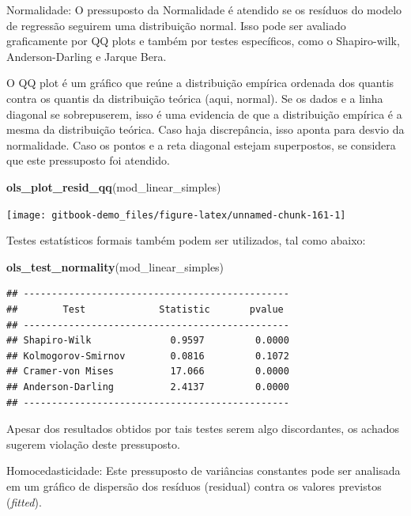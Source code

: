 \documentclass[
]{book}
\newenvironment{Shaded}{\begin{snugshade}}{\end{snugshade}}
\newcommand{\KeywordTok}[1]{\textcolor[rgb]{0.13,0.29,0.53}{\textbf{#1}}}
\newcommand{\NormalTok}[1]{#1}
\begin{document}
Normalidade: O pressuposto da Normalidade é atendido se os resíduos do modelo de regressão seguirem uma distribuição normal. Isso pode ser avaliado graficamente por QQ plots e também por testes específicos, como o Shapiro-wilk, Anderson-Darling e Jarque Bera.

O QQ plot é um gráfico que reúne a distribuição empírica ordenada dos quantis contra os quantis da distribuição teórica (aqui, normal). Se os dados e a linha diagonal se sobrepuserem, isso é uma evidencia de que a distribuição empírica é a mesma da distribuição teórica. Caso haja discrepância, isso aponta para desvio da normalidade. Caso os pontos e a reta diagonal estejam superpostos, se considera que este pressuposto foi atendido.

\begin{Shaded}
\begin{Highlighting}[]
\KeywordTok{ols_plot_resid_qq}\NormalTok{(mod_linear_simples)}
\end{Highlighting}
\end{Shaded}

\begin{center}\texttt{[image: gitbook-demo\_files/figure-latex/unnamed-chunk-161-1]} \end{center}

Testes estatísticos formais também podem ser utilizados, tal como abaixo:

\begin{Shaded}
\begin{Highlighting}[]
\KeywordTok{ols_test_normality}\NormalTok{(mod_linear_simples)}
\end{Highlighting}
\end{Shaded}

\begin{verbatim}
## -----------------------------------------------
##        Test             Statistic       pvalue  
## -----------------------------------------------
## Shapiro-Wilk              0.9597         0.0000 
## Kolmogorov-Smirnov        0.0816         0.1072 
## Cramer-von Mises          17.066         0.0000 
## Anderson-Darling          2.4137         0.0000 
## -----------------------------------------------
\end{verbatim}

Apesar dos resultados obtidos por tais testes serem algo discordantes, os achados sugerem violação deste pressuposto.

Homocedasticidade: Este pressuposto de variâncias constantes pode ser analisada em um gráfico de dispersão dos resíduos (residual) contra os valores previstos (\emph{fitted}).
\end{document}
